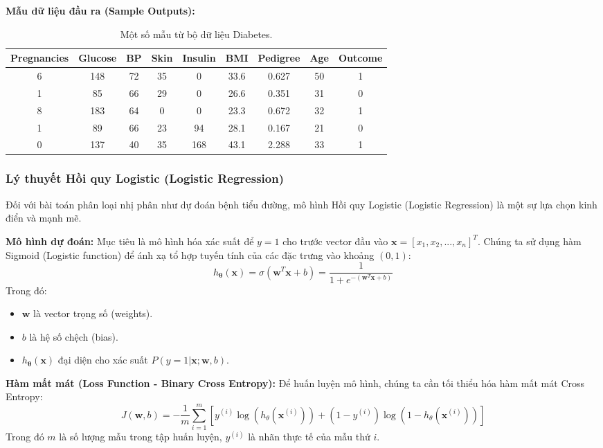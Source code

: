 \documentclass[12pt,a4paper]{article}
\begin{document}
\textbf{Mẫu dữ liệu đầu ra (Sample Outputs):}
\begin{table}[h]
\centering
\begin{tabular}{|c|c|c|c|c|c|c|c|c|}
\hline
Pregnancies & Glucose & BP & Skin & Insulin & BMI & Pedigree & Age & Outcome \\
\hline
6 & 148 & 72 & 35 & 0 & 33.6 & 0.627 & 50 & 1 \\
1 & 85  & 66 & 29 & 0 & 26.6 & 0.351 & 31 & 0 \\
8 & 183 & 64 & 0  & 0 & 23.3 & 0.672 & 32 & 1 \\
1 & 89  & 66 & 23 & 94& 28.1 & 0.167 & 21 & 0 \\
0 & 137 & 40 & 35 & 168&43.1 & 2.288 & 33 & 1 \\
\hline
\end{tabular}
\caption{Một số mẫu từ bộ dữ liệu Diabetes.}
\end{table}

\subsubsection{Lý thuyết Hồi quy Logistic (Logistic Regression)}
Đối với bài toán phân loại nhị phân như dự đoán bệnh tiểu đường, mô hình Hồi quy Logistic (Logistic Regression) là một sự lựa chọn kinh điển và mạnh mẽ. 

\textbf{Mô hình dự đoán:}
Mục tiêu là mô hình hóa xác suất để $y=1$ cho trước vector đầu vào $\mathbf{x} = [x_1, x_2, ..., x_n]^T$. Chúng ta sử dụng hàm Sigmoid (Logistic function) để ánh xạ tổ hợp tuyến tính của các đặc trưng vào khoảng $(0, 1)$:
\begin{equation}
h_{\mathbf{\theta}}(\mathbf{x}) = \sigma(\mathbf{w}^T\mathbf{x} + b) = \frac{1}{1 + e^{-(\mathbf{w}^T\mathbf{x} + b)}}
\end{equation}
Trong đó:
\begin{itemize}
    \item $\mathbf{w}$ là vector trọng số (weights).
    \item $b$ là hệ số chệch (bias).
    \item $h_{\mathbf{\theta}}(\mathbf{x})$ đại diện cho xác suất $P(y=1|\mathbf{x}; \mathbf{w}, b)$.
\end{itemize}

\textbf{Hàm mất mát (Loss Function - Binary Cross Entropy):}
Để huấn luyện mô hình, chúng ta cần tối thiểu hóa hàm mất mát Cross Entropy:
\begin{equation}
J(\mathbf{w}, b) = -\frac{1}{m} \sum_{i=1}^{m} \left[ y^{(i)} \log(h_{\theta}(\mathbf{x}^{(i)})) + (1 - y^{(i)}) \log(1 - h_{\theta}(\mathbf{x}^{(i)})) \right]
\end{equation}
Trong đó $m$ là số lượng mẫu trong tập huấn luyện, $y^{(i)}$ là nhãn thực tế của mẫu thứ $i$.
\end{document}
